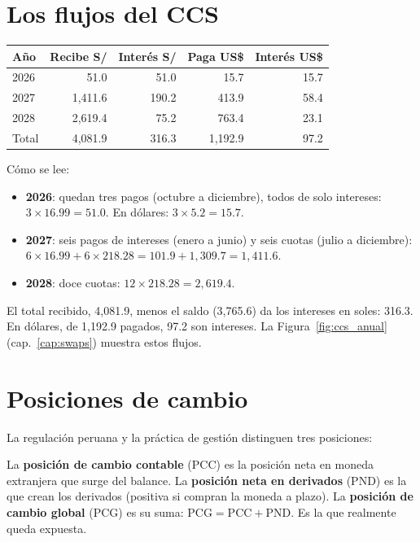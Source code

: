 \section{Los flujos del CCS}

\begin{center}\small
{}\label{tab:c4}
\begin{tabular}{@{}lrrrr@{}}
\toprule
Año & Recibe S/ & Interés S/ & Paga US\$ & Interés US\$\\
\midrule
2026 & 51.0 & 51.0 & 15.7 & 15.7\\
2027 & 1,411.6 & 190.2 & 413.9 & 58.4\\
2028 & 2,619.4 & 75.2 & 763.4 & 23.1\\
\midrule
Total & 4,081.9 & 316.3 & 1,192.9 & 97.2\\
\bottomrule
\end{tabular}
\end{center}

Cómo se lee:
\begin{itemize}
\item \textbf{2026}: quedan tres pagos (octubre a diciembre), todos de solo intereses: $3\times16.99=51.0$. En dólares: $3\times5.2=15.7$.
\item \textbf{2027}: seis pagos de intereses (enero a junio) y seis cuotas (julio a diciembre): $6\times16.99+6\times218.28=101.9+1{,}309.7=1{,}411.6$.
\item \textbf{2028}: doce cuotas: $12\times218.28=2{,}619.4$.
\end{itemize}
El total recibido, 4,081.9, menos el saldo (3,765.6) da los intereses en soles: 316.3. En dólares, de 1,192.9 pagados, 97.2 son intereses. La Figura~\ref{fig:ccs_anual} (cap.~\ref{cap:swaps}) muestra estos flujos.

\section{Posiciones de cambio}

La regulación peruana y la práctica de gestión distinguen tres posiciones:

\begin{definicion}
La \textbf{posición de cambio contable} (PCC) es la posición neta en moneda extranjera que surge del balance. La \textbf{posición neta en derivados} (PND) es la que crean los derivados (positiva si compran la moneda a plazo). La \textbf{posición de cambio global} (PCG) es su suma: $\text{PCG}=\text{PCC}+\text{PND}$. Es la que realmente queda expuesta.
\end{definicion}

